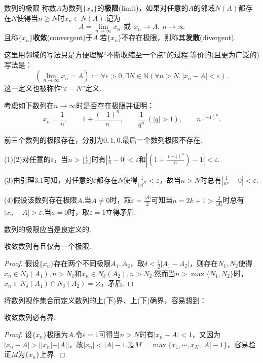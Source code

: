 \documentclass[lang=cn, zihao=5]{elegantbook}
\newcommand{\ssb}[1]{\left( #1 \right)}
\begin{document}
\begin{definition}{数列的极限}
	称数$A$为数列$\{ x_n \}$的\textbf{极限}(limit)，如果对任意的$A$的邻域$N(A)$都存在$N$使得当$n \geq N$时$x_n \in N(A)$.记为$$A = \lim_{n \to \infty} x_n ~~ \text{或} ~~ x_n \to A,~n \to \infty$$且称$\{ x_n \}$\textbf{收敛}(convergent)于$A$.若$\{ x_n \}$不存在极限，则称其\textbf{发散}(divergent).
\end{definition}
\begin{remark}
	这里用邻域的写法只是方便理解“不断收缩至一个点”的过程.等价的(且更为广泛的)写法是：$$\ssb{\lim_{n \to \infty} x_n = A} := \forall \varepsilon > 0 , \exists N \in \mathbb{N} (\forall n>N,|x_n-A|<\varepsilon ).$$
	这一定义也被称作“$\varepsilon -N$”定义.
\end{remark}

\begin{example}
	考虑如下数列在$n\to \infty$时是否存在极限并证明：$$x_n=\frac{1}{n},\qquad 1+\frac{(-1)^n}{n},\qquad \frac{1}{q^n}~(|q|>1),\qquad n^{(-1)^n}.$$
\end{example}
\begin{solution}
	前三个数列的极限存在，分别为$0,1,0$.最后一个数列极限不存在.
	
	(1)(2)对任意的$\varepsilon$，当$n>\lfloor \frac{1}{\varepsilon} \rfloor$时有$|\frac{1}{n} -0|<\varepsilon$和$|(1+\frac{(-1)^n}{n})-1|<\varepsilon$.
	
	(3)由引理3.1可知，对任意的$\varepsilon$都存在$N$使得$\frac{1}{|q|^N}<\varepsilon$，故当$n>N$时总有$|\frac{1}{a^n}-0|<\varepsilon$.
	
	(4)假设该数列存在极限$A$.当$A \neq 0$时，取$\varepsilon = \frac{|A|}{2}$可知当$n=2k+1 > \frac{2}{|A|}$时总有$|x_n-A|>\varepsilon$.当$a=0$时，取$\varepsilon =1$立得矛盾.
\end{solution}

数列的极限应当是良定义的.

\begin{proposition}
	收敛数列有且仅有一个极限.
\end{proposition}
\begin{proof}
	假设$\{ x_n \}$存在两个不同极限$A_1,A_2$，取$\delta < \frac{1}{2}|A_1-A_2|$，则存在$N_1,N_2$使得$x_n \in N_{\delta}(A_1),n > N_1$和$x_n \in N_{\delta}(A_2),n > N_2$.然而当$n>\max \{ N_1,N_2 \}$时，$x_n \in N_{\delta}(A_1) \cap N_{\delta}(A_2) = \varnothing$，矛盾.
\end{proof}

将数列视作集合而定义数列的上(下)界、上(下)确界，容易想到：

\begin{proposition}
	收敛数列必有界.
\end{proposition}
\begin{proof}
	设$\{ x_n \}$极限为$A$.令$\varepsilon = 1$可得当$n>N$时有$|x_n-A|<1$，又因为$|x_n-A|>||x_n|-|A||$，故$|x_n|<|A|-1$.设$M=\max \{ x_1, \cdots ,x_N,|A|-1 \}$，容易验证$M$为$\{ x_n \}$上界.
\end{proof}
\end{document}
